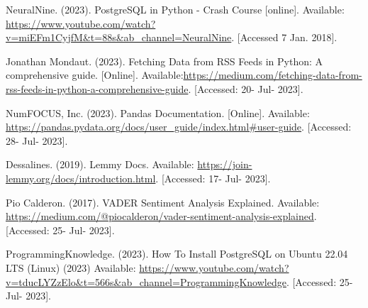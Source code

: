 \documentclass[letterpaper, 12 pt, conference]{ieeeconf}
\begin{document}
\begin{thebibliography}{99}

 NeuralNine. (2023). PostgreSQL in Python - Crash Course [online]. Available: \url{https://www.youtube.com/watch?v=miEFm1CyjfM&t=88s&ab_channel=NeuralNine}. [Accessed 7 Jan. 2018].


Jonathan Mondaut. (2023). Fetching Data from RSS Feeds in Python: A comprehensive guide. [Online]. Available:\url{https://medium.com/fetching-data-from-rss-feeds-in-python-a-comprehensive-guide}. [Accessed: 20- Jul- 2023].

  NumFOCUS, Inc. (2023). Pandas Documentation.  [Online]. Available: \url{https://pandas.pydata.org/docs/user_guide/index.html#user-guide}. [Accessed: 28- Jul- 2023].


 Dessalines. (2019). Lemmy Docs. Available: \url{https://join-lemmy.org/docs/introduction.html}. [Accessed: 17- Jul- 2023].

 Pio Calderon. (2017). VADER Sentiment Analysis Explained. Available: \url{https://medium.com/@piocalderon/vader-sentiment-analysis-explained}. [Accessed: 25- Jul- 2023].

 ProgrammingKnowledge. (2023). How To Install PostgreSQL on Ubuntu 22.04 LTS (Linux) (2023) Available: \url{https://www.youtube.com/watch?v=tducLYZzElo&t=566s&ab_channel=ProgrammingKnowledge}. [Accessed: 25- Jul- 2023].


\end{thebibliography}
\end{document}
